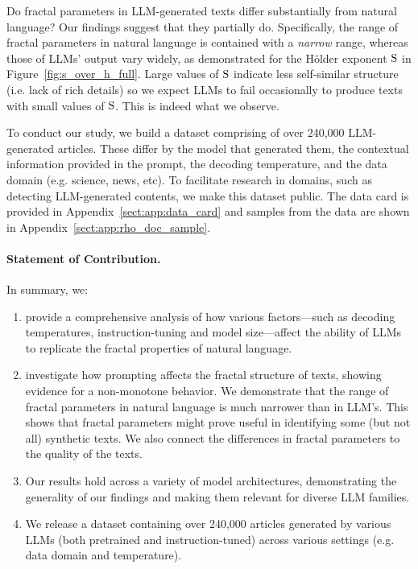 Do fractal parameters in LLM-generated texts differ substantially from natural language?  Our findings suggest that they partially do.  Specifically, the range of fractal parameters in natural language is contained with a \emph{narrow} range, whereas those of LLMs' output vary widely, as demonstrated for the H\"older exponent $\mathrm{S}$ in Figure~\ref{fig:s_over_h_full}. Large values of $\mathrm{S}$ indicate less self-similar structure (i.e. lack of rich details) so we expect LLMs to fail occasionally to produce texts with small values of $\mathrm{S}$. This is indeed what we observe.  %

To conduct our study, we build a dataset comprising of over 240,000 LLM-generated articles. These  differ by the model that generated them, the contextual information provided in the prompt, the decoding temperature, and the data domain (e.g.  science, news, etc). To facilitate research in domains, such as detecting LLM-generated contents, we make this dataset public. The data card is provided in Appendix~\ref{sect:app:data_card} and samples from the data are shown in Appendix~\ref{sect:app:rho_doc_sample}.
\paragraph{Statement of Contribution.}In summary, we:
\begin{enumerate}
    \item provide a comprehensive analysis of how various factors---such as decoding temperatures, instruction-tuning and model size---affect the ability of LLMs to replicate the fractal properties of natural language.
    \item investigate how prompting affects the fractal structure of texts, showing evidence for a non-monotone behavior. We demonstrate that the range of fractal parameters in natural language is much narrower than in LLM's. This shows that fractal parameters might prove useful in identifying some (but not all) synthetic texts. We also connect the differences in fractal parameters to the quality of the texts.
    \item Our results hold across a variety of model architectures, demonstrating the generality of our findings and making them relevant for diverse LLM families.
    \item We release a dataset containing over 240,000 articles generated by various LLMs (both pretrained and instruction-tuned) across various settings (e.g. data domain and temperature).
\end{enumerate}
